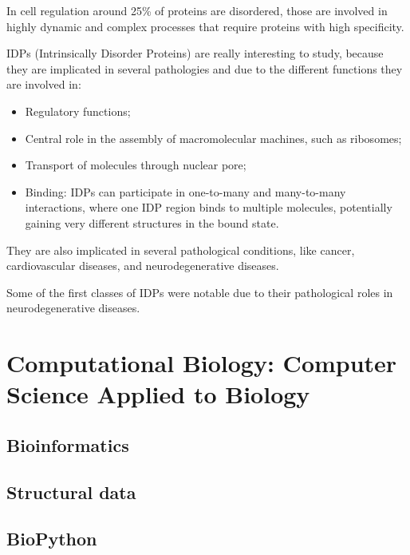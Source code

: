 In cell regulation around 25\% of proteins are disordered, those are involved in highly dynamic and complex processes that require proteins with high specificity.

IDPs (Intrinsically Disorder Proteins) are really interesting to study, because they are implicated in several pathologies and due to the different functions they are involved in:
\begin{itemize}
	\item Regulatory functions;
	\item Central role in the assembly of macromolecular machines, such as ribosomes;
	\item Transport of molecules through nuclear pore;
	\item Binding: IDPs can participate in one-to-many and many-to-many interactions, where one IDP region binds to multiple molecules, potentially gaining very different structures in the bound state.
\end{itemize}
 They are also implicated in several pathological conditions, like cancer, cardiovascular diseases, and neurodegenerative diseases. 

Some of the first classes of IDPs were notable due to their pathological roles in neurodegenerative diseases.
\section{Computational Biology: Computer Science Applied to Biology}
\subsection{Bioinformatics}
\subsection{Structural data}
\subsection{BioPython}